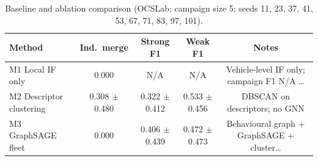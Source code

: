 \begin{table}[t]
\centering
\caption{Baseline and ablation comparison (OCSLab; campaign size 5; seeds 11, 23, 37, 41, 53, 67, 71, 83, 97, 101).}
\label{tab:baseline_ablation}
\begin{tabular}{@{}lcccc@{}}
\toprule
Method & Ind.\ merge & Strong F1 & Weak F1 & Notes \\
\midrule
M1 Local IF only & 0.000 & N/A & N/A & Vehicle-level IF only; campaign F1 N/A \ldots \\
M2 Descriptor clustering & 0.308 $\pm$ 0.480 & 0.322 $\pm$ 0.412 & 0.533 $\pm$ 0.456 & DBSCAN on descriptors; no GNN \\
M3 GraphSAGE fleet & 0.000 & 0.406 $\pm$ 0.439 & 0.472 $\pm$ 0.473 & Behavioural graph + GraphSAGE + cluster\ldots \\
\bottomrule
\end{tabular}
\end{table}
